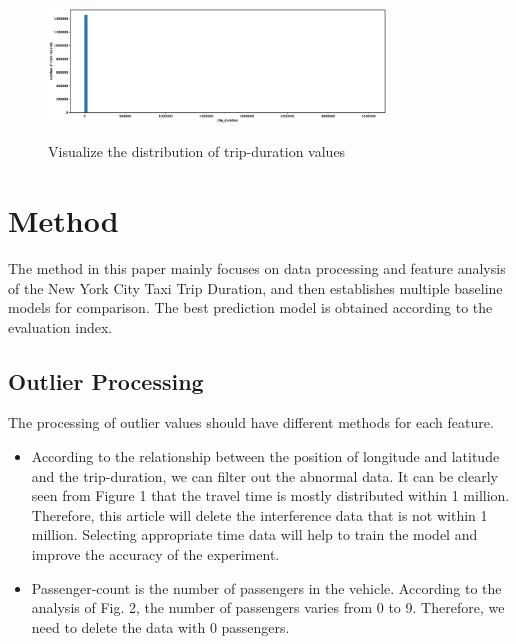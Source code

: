 \documentclass{amsart}
\begin{document}
\begin{figure}
  \centering
   \includegraphics[width=0.8\textwidth]{figure//fig-1.eps}\\
  \caption{Visualize the distribution of trip-duration values}\label{fig:demical1}
\end{figure}



\section{Method} \label{sec-method}


The method in this paper mainly focuses on data processing and feature analysis of the New York City Taxi Trip Duration, and then establishes multiple baseline models for comparison. The best prediction model is obtained according to the evaluation index.

\subsection{Outlier Processing}
The processing of outlier values should have different methods for each feature.
\begin{itemize}
    \item  
  According to the relationship between the position of longitude and latitude and the trip-duration, we can filter out the abnormal data. It can be clearly seen from Figure 1 that the travel time is mostly distributed within 1 million. Therefore, this article will delete the interference data that is not within 1 million. Selecting appropriate time data will help to train the model and improve the accuracy of the experiment.
   \item
  Passenger-count is the number of passengers in the vehicle. According to the analysis of Fig. 2, the number of passengers varies from 0 to 9. Therefore, we need to delete the data with 0 passengers.
  \end{itemize}
\end{document}

